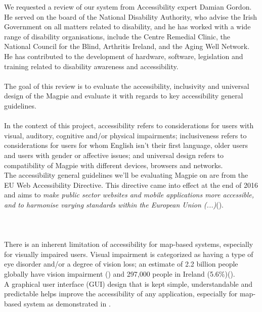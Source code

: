 We requested a review of our system from Accessibility expert Damian Gordon. He served on the board of the National Disability Authority, who advise the Irish Government on all matters related to disability, and he has worked with a wide range of disability organisations, include the Centre Remedial Clinic, the National Council for the Blind, Arthritis Ireland, and the Aging Well Network. He has contributed to the development of hardware, software, legislation and training related to disability awareness and accessibility. \\\\
The goal of this review is to evaluate the accessibility, inclusivity and universal design of the Magpie and evaluate it with regards to key accessibility general guidelines.\\\\

In the context of this project, accessibility refers to considerations for users with visual, auditory, cognitive and/or physical impairments; inclusiveness refers to considerations for users for whom English isn't their first language, older users and users with gender or affective issues; and universal design refers to compatibility of Magpie with different devices, browsers and networks.\\
The accessibility general guidelines we'll be evaluating Magpie on are from the EU Web Accessibility Directive. This directive came into effect at the end of 2016 and aims to \emph{make public sector websites and mobile applications more accessible, and to harmonise varying standards within the European Union (...)}(\cite{webaccessibilitydirective2016}).\\\\
\\
\\
There is an inherent limitation of accessibility for map-based systems, especially for visually impaired users. Visual impairment is categorized as having a type of eye disorder and/or a degree of vision loss; an estimate of 2.2 billion people globally have vision impairment (\cite{whoworldreportvision2019}) and 297,000 people in Ireland (5.6\%)(\cite{visionirelandcensus}).\\
A graphical user interface (GUI) design that is kept simple, understandable and predictable helps improve the accessibility of any application, especially for map-based system as demonstrated in \cite{usabilityaccessibilitywebmaps2016}.


